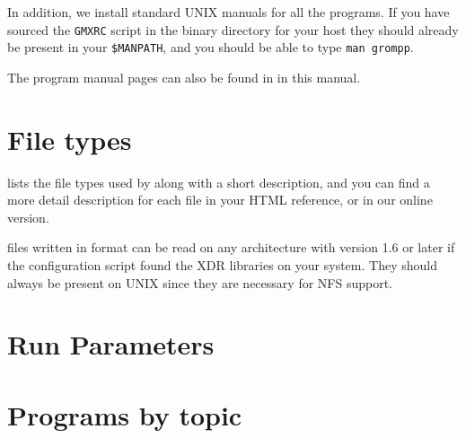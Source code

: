 In addition, we install standard UNIX manuals for all the programs. If
you have sourced the {\tt GMXRC} script in the {\gromacs} binary directory for
your host they should already be present in your {\tt \$MANPATH}, and you
should be able to type {\eg} {\tt man grompp}.

The program manual pages can also be found in
 in this manual.

\section{File types}
\label{sec:fileformats}
 lists the file types used by {\gromacs} along with
a short description, and you can find a more detail description for
each file in your HTML reference, or in our online version.

{\gromacs} files written in  format can be read on any
architecture with {\gromacs} version 1.6 or later if the configuration
script found the XDR libraries on your system. They should always be
present on UNIX since they are necessary for NFS support.



\section{Run Parameters}


\section{Programs by topic}


